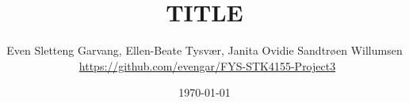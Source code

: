 \documentclass[reprint,english,notitlepage,nofootinbib]{revtex4-1}  %
\begin{document}

\title{TITLE}
\author{Even Sletteng Garvang, Ellen-Beate Tysvær, Janita Ovidie Sandtrøen Willumsen \\ \faGithub \, \url{https://github.com/evengar/FYS-STK4155-Project3}}        
\date{\today}
\noaffiliation


\maketitle





\newpage

 

\onecolumngrid
\newpage 
\printbibliography

\newpage
\twocolumngrid
\appendix



\end{document}
